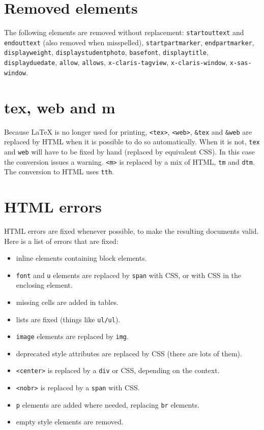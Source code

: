\section{Removed elements}
The following elements are removed without replacement:
\texttt{startouttext} and \texttt{endouttext} (also removed when misspelled), \texttt{startpartmarker}, \texttt{endpartmarker}, \texttt{displayweight}, \texttt{displaystudentphoto}, \texttt{basefont}, \texttt{displaytitle}, \texttt{displayduedate}, \texttt{allow}, \texttt{allows}, \texttt{x-claris-tagview}, \texttt{x-claris-window}, \texttt{x-sas-window}.

\section{tex, web and m}
Because LaTeX is no longer used for printing, \texttt{<tex>}, \texttt{<web>}, \texttt{\&tex} and \texttt{\&web} are replaced by HTML when it is possible to do so automatically.
When it is not, \texttt{tex} and \texttt{web} will have to be fixed by hand (replaced by equivalent CSS). In this case the conversion issues a warning.
\texttt{<m>} is replaced by a mix of HTML, \texttt{tm} and \texttt{dtm}. The conversion to HTML uses \texttt{tth}.

\section{HTML errors}
HTML errors are fixed whenever possible, to make the resulting documents valid. Here is a list of errors that are fixed:
\begin{itemize}
\item inline elements containing block elements.
\item \texttt{font} and \texttt{u} elements are replaced by \texttt{span} with CSS, or with CSS in the enclosing element.
\item missing cells are added in tables.
\item lists are fixed (things like \texttt{ul/ul}).
\item \texttt{image} elements are replaced by \texttt{img}.
\item deprecated style attributes are replaced by CSS (there are lots of them).
\item \texttt{<center>} is replaced by a \texttt{div} or CSS, depending on the context.
\item \texttt{<nobr>} is replaced by a \texttt{span} with CSS.
\item \texttt{p} elements are added where needed, replacing \texttt{br} elements.
\item empty style elements are removed.
\end{itemize}

